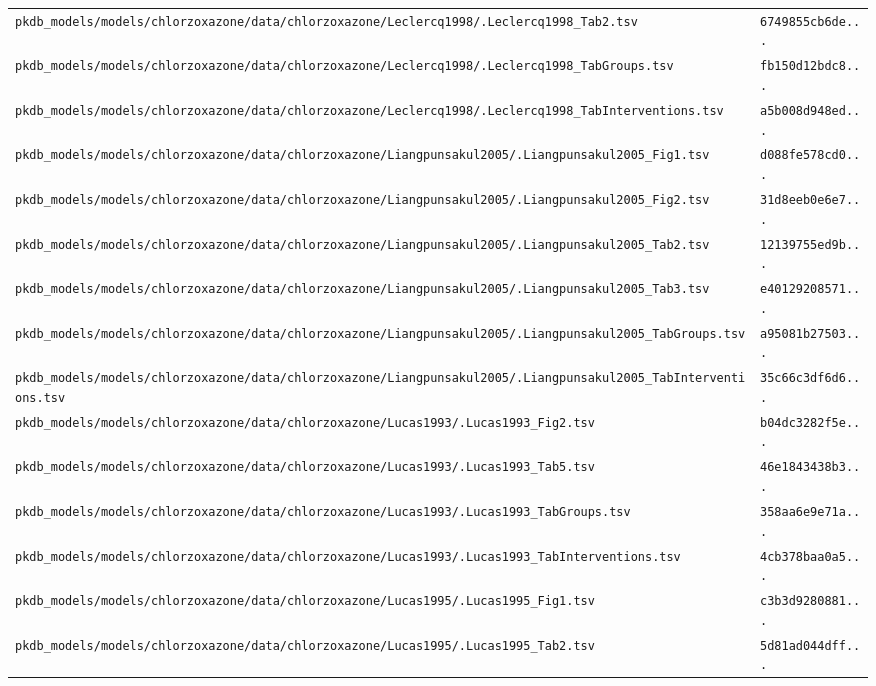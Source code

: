 \documentclass{article}
\begin{document}
\begin{longtable}{ll}
\texttt{pkdb\_models/models/chlorzoxazone/data/chlorzoxazone/Leclercq1998/.Leclercq1998\_Tab2.tsv} & \texttt{6749855cb6de...} \\
\texttt{pkdb\_models/models/chlorzoxazone/data/chlorzoxazone/Leclercq1998/.Leclercq1998\_TabGroups.tsv} & \texttt{fb150d12bdc8...} \\
\texttt{pkdb\_models/models/chlorzoxazone/data/chlorzoxazone/Leclercq1998/.Leclercq1998\_TabInterventions.tsv} & \texttt{a5b008d948ed...} \\
\texttt{pkdb\_models/models/chlorzoxazone/data/chlorzoxazone/Liangpunsakul2005/.Liangpunsakul2005\_Fig1.tsv} & \texttt{d088fe578cd0...} \\
\texttt{pkdb\_models/models/chlorzoxazone/data/chlorzoxazone/Liangpunsakul2005/.Liangpunsakul2005\_Fig2.tsv} & \texttt{31d8eeb0e6e7...} \\
\texttt{pkdb\_models/models/chlorzoxazone/data/chlorzoxazone/Liangpunsakul2005/.Liangpunsakul2005\_Tab2.tsv} & \texttt{12139755ed9b...} \\
\texttt{pkdb\_models/models/chlorzoxazone/data/chlorzoxazone/Liangpunsakul2005/.Liangpunsakul2005\_Tab3.tsv} & \texttt{e40129208571...} \\
\texttt{pkdb\_models/models/chlorzoxazone/data/chlorzoxazone/Liangpunsakul2005/.Liangpunsakul2005\_TabGroups.tsv} & \texttt{a95081b27503...} \\
\texttt{pkdb\_models/models/chlorzoxazone/data/chlorzoxazone/Liangpunsakul2005/.Liangpunsakul2005\_TabInterventions.tsv} & \texttt{35c66c3df6d6...} \\
\texttt{pkdb\_models/models/chlorzoxazone/data/chlorzoxazone/Lucas1993/.Lucas1993\_Fig2.tsv} & \texttt{b04dc3282f5e...} \\
\texttt{pkdb\_models/models/chlorzoxazone/data/chlorzoxazone/Lucas1993/.Lucas1993\_Tab5.tsv} & \texttt{46e1843438b3...} \\
\texttt{pkdb\_models/models/chlorzoxazone/data/chlorzoxazone/Lucas1993/.Lucas1993\_TabGroups.tsv} & \texttt{358aa6e9e71a...} \\
\texttt{pkdb\_models/models/chlorzoxazone/data/chlorzoxazone/Lucas1993/.Lucas1993\_TabInterventions.tsv} & \texttt{4cb378baa0a5...} \\
\texttt{pkdb\_models/models/chlorzoxazone/data/chlorzoxazone/Lucas1995/.Lucas1995\_Fig1.tsv} & \texttt{c3b3d9280881...} \\
\texttt{pkdb\_models/models/chlorzoxazone/data/chlorzoxazone/Lucas1995/.Lucas1995\_Tab2.tsv} & \texttt{5d81ad044dff...} \\

\end{longtable}
\end{document}
